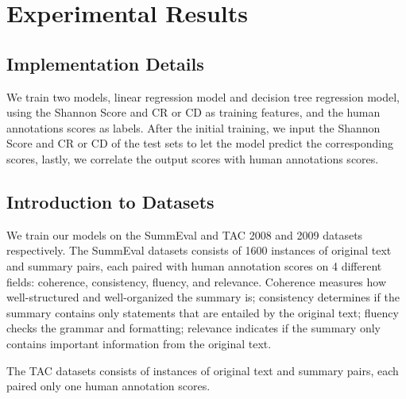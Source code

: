 \section{Experimental Results}

\subsection{Implementation Details}
We train two models, linear regression model and decision tree regression model, using the Shannon Score and CR or CD as training features, and the human annotations scores as labels. After the initial training, we input the Shannon Score and CR or CD of the test sets to let the model predict the corresponding scores, lastly, we correlate the output scores with human annotations scores. 

\subsection{Introduction to Datasets}
We train our models on the SummEval and TAC 2008 and 2009 datasets respectively. The SummEval datasets consists of 1600 instances of original text and summary pairs, each paired with human annotation scores on 4 different fields: coherence, consistency, fluency, and relevance. Coherence measures how well-structured and well-organized the summary is; consistency determines if the summary contains only statements that are entailed by the original text; fluency checks the grammar and formatting; relevance indicates if the summary only contains important information from the original text.

The TAC datasets consists of instances of original text and summary pairs, each paired only one human annotation scores.


